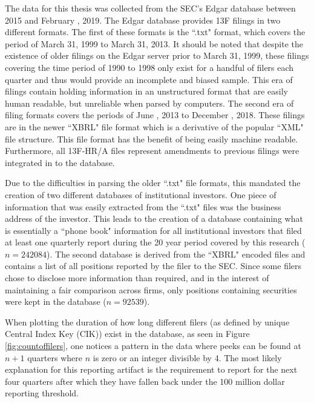 The data for this thesis was collected from the SEC's Edgar database between 2015 and February , 2019.  The Edgar database provides 13F filings in two different formats.  The first of these formats is the ``.txt" format, which covers the period of March 31, 1999 to March 31, 2013. It should be noted that despite the existence of older filings on the Edgar server prior to March 31, 1999, these filings covering the time period of 1990 to 1998 only exist for a handful of filers each quarter and thus would provide an incomplete and biased sample.  This era of filings contain holding information in an unstructured format that are easily human readable, but unreliable when parsed by computers.  The second era of filing formats covers the periods of June , 2013 to December , 2018.  These filings are in the newer ``XBRL" file format which is a derivative of the popular ``XML" file structure.  This file format has the benefit of being easily machine readable.  Furthermore, all 13F-HR/A files represent amendments to previous filings were integrated in to the database. 

Due to the difficulties in parsing the older ``.txt" file formats, this mandated the creation of two different databases of institutional investors.  One piece of information that was easily extracted from the ``.txt" files was the business address of the investor.  This leads to the creation of a database containing what is essentially a ``phone book" information for all institutional investors that filed at least one quarterly report during the 20 year period covered by this research ($n = 242084$). The second database is derived from the ``XBRL" encoded files and contains a list of all positions reported by the filer to the SEC. Since some filers chose to disclose more information than required, and in the interest of maintaining a fair comparison across firms, only positions containing securities were kept in the database ($n=92539$).  

\label{Section:13F}

When plotting the duration of how long different filers (as defined by unique Central Index Key (CIK)) exist in the database, as seen in Figure \ref{fig:countoffilers}, one notices a pattern in the data where peeks can be found at $n+1$ quarters where $n$ is zero or an integer divisible by 4.  The most likely explanation for this reporting artifact is the requirement to report for the next four quarters after which they have fallen back under the 100 million dollar reporting threshold.   

